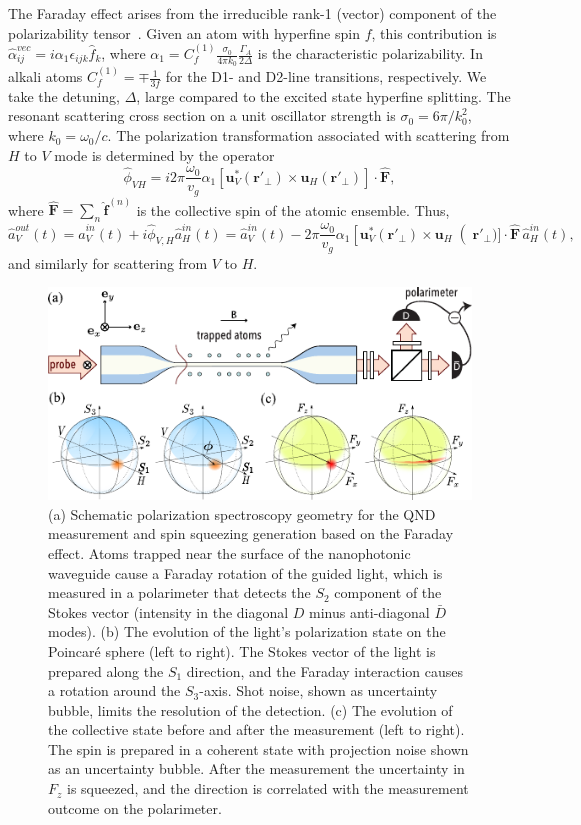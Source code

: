 \documentclass[preprint,aps,pra,onecolumn,superscriptaddress]{revtex4-1} %
\newcommand{\mbf}[1]{\mathbf{#1}}
\newcommand{\Poincare}{Poincar\'e\xspace}
\begin{document}
The Faraday effect arises from the irreducible rank-1 (vector) component of the polarizability tensor~\cite{Deutsch2010a}.  Given an atom with hyperfine spin $f$, this contribution is $\hat{\alpha}^{vec}_{ij} = i \alpha_1 \epsilon_{ijk} \hat{f}_k$, where $\alpha_1 = C^{(1)}_{f}\frac{\sigma_0}{4\pi k_0}\frac{\Gamma_A}{2\Delta} $ is the characteristic polarizability.  In alkali atoms $C^{(1)}_f=\mp\frac{1}{3f}$ for the D1- and D2-line transitions, respectively.  We take the detuning, $ \Delta $, large compared to the excited state hyperfine splitting.  The resonant scattering cross section on a unit oscillator strength is $\sigma_0 = 6\pi/k_0^2$, where $k_0=\omega_0/c$.  The polarization transformation associated with scattering from $H$ to $V$ mode is determined by the operator
\begin{equation}
\hat{\phi}_{VH} = i 2\pi \frac{\omega_0}{v_g}\alpha_1 \left[ \mbf{u}^*_V (\mbf{r}'_\perp) \times  \mbf{u}_{H} (\mbf{r}'_\perp) \right] \cdot \hat{\mbf{F}},
\end{equation}
where $\hat{\mbf{F}}=\sum_n \hat{\mbf{f}}^{(n)}$ is the collective spin of the atomic ensemble.  Thus,
\begin{equation}\label{eq:aoutain}
\hat{a}^{out}_V(t) = \hat{a}^{in}_V(t)  +i  \hat{\phi}_{V,H} \hat{a}^{in}_{H}(t)= \hat{a}^{in}_V(t)  - 2\pi \frac{\omega_0}{v_g}\alpha_1 \left[ \mbf{u}^*_V (\mbf{r}'_\perp) \times  \mbf{u}_{H}\right(\mbf{r}'_\perp)]  \cdot \hat{\mbf{F}}\, \hat{a}^{in}_{H}(t),
\end{equation}
 and similarly for scattering from $V$ to $H$.

\begin{figure}[htb]
\centering
  \includegraphics[width=.45\textwidth]{fig/FaradaySchematics}
  \caption{(a) Schematic polarization spectroscopy geometry for the QND measurement and spin squeezing generation based on the Faraday effect.  Atoms trapped near the surface of the nanophotonic waveguide cause a Faraday rotation of the guided light, which is measured in a polarimeter that detects the $S_2$ component of the Stokes vector (intensity in the diagonal $D$ minus anti-diagonal $\bar{D}$ modes).  (b) The evolution of the light's polarization state on the \Poincare sphere  (left to right).  The Stokes vector of the light is prepared along the $S_1$ direction, and the Faraday interaction causes a rotation around the $S_3$-axis.  Shot noise, shown as uncertainty bubble, limits the resolution of the detection. (c) The evolution of the collective state before and after the measurement (left to right).  The spin is prepared in a coherent state with projection noise shown as an uncertainty bubble.  After the measurement the uncertainty in $F_z$ is squeezed, and the direction is correlated with the measurement outcome on the polarimeter. }\label{fig:spinsqueezingschematic}
\end{figure}
\end{document}
